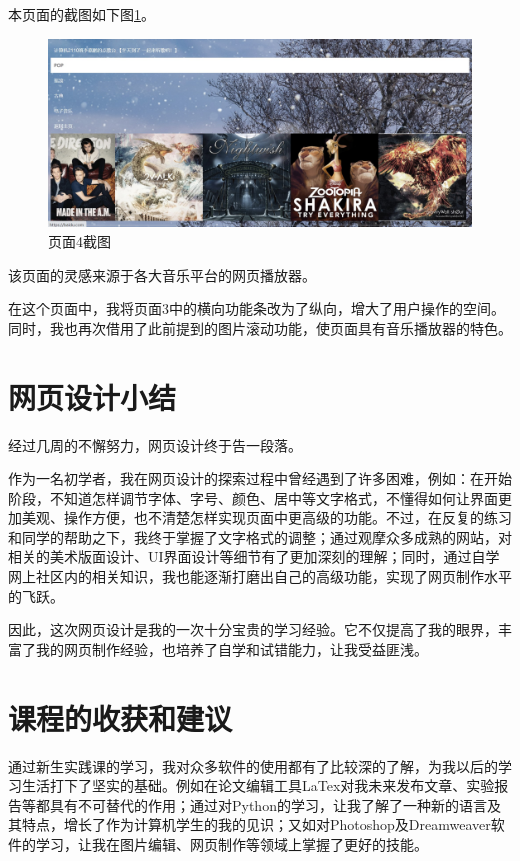 \documentclass[supercite]{Experimental_Report}
\theoremstyle{definition}
\begin{document}
	本页面的截图如下图\ref{fig3-7}。
	
	\begin{figure}[htb]
		\begin{center}
			\includegraphics[scale=0.43]{images/3-7.jpg}
			\caption{页面4截图}
			\label{fig3-7}
		\end{center}
	\end{figure}
	
	该页面的灵感来源于各大音乐平台的网页播放器。
	
	在这个页面中，我将页面3中的横向功能条改为了纵向，增大了用户操作的空间。同时，我也再次借用了此前提到的图片滚动功能，使页面具有音乐播放器的特色。
	
	\newpage
	
	\section{网页设计小结}
	
	经过几周的不懈努力，网页设计终于告一段落。
	
	作为一名初学者，我在网页设计的探索过程中曾经遇到了许多困难，例如：在开始阶段，不知道怎样调节字体、字号、颜色、居中等文字格式，不懂得如何让界面更加美观、操作方便，也不清楚怎样实现页面中更高级的功能。不过，在反复的练习和同学的帮助之下，我终于掌握了文字格式的调整；通过观摩众多成熟的网站，对相关的美术版面设计、UI界面设计等细节有了更加深刻的理解；同时，通过自学网上社区内的相关知识，我也能逐渐打磨出自己的高级功能，实现了网页制作水平的飞跃。
	
	因此，这次网页设计是我的一次十分宝贵的学习经验。它不仅提高了我的眼界，丰富了我的网页制作经验，也培养了自学和试错能力，让我受益匪浅。
	
	\newpage
	
	\section{课程的收获和建议}
	
	通过新生实践课的学习，我对众多软件的使用都有了比较深的了解，为我以后的学习生活打下了坚实的基础。例如在论文编辑工具LaTex对我未来发布文章、实验报告等都具有不可替代的作用；通过对Python的学习，让我了解了一种新的语言及其特点，增长了作为计算机学生的我的见识；又如对Photoshop及Dreamweaver软件的学习，让我在图片编辑、网页制作等领域上掌握了更好的技能。
	
\end{document}
